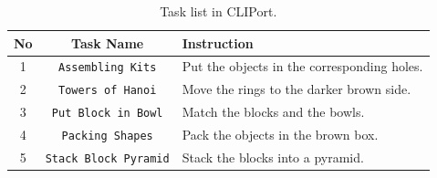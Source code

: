 \begin{table}[H]
\centering
\caption{Task list in CLIPort.}
\label{tab:cliport_task_list}
\renewcommand\arraystretch{1.1}
\begin{tabular}{@{}ccl@{}}
\toprule
No & Task Name & Instruction \\ \midrule
1 & \texttt{Assembling Kits} & Put the objects in the corresponding holes. \\
2 & \texttt{Towers of Hanoi} & Move the rings to the darker brown side. \\
3 & \texttt{Put Block in Bowl} & Match the blocks and the bowls. \\
4 & \texttt{Packing Shapes} & Pack the objects in the brown box. \\
5 & \texttt{Stack Block Pyramid} & Stack the blocks into a pyramid. \\
\bottomrule 
\end{tabular}
\end{table}